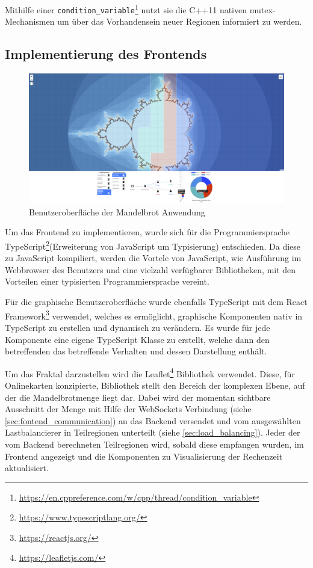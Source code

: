 Mithilfe einer \texttt{condition\_variable}\footnote{\url{https://en.cppreference.com/w/cpp/thread/condition_variable}}
nutzt sie die C++11 nativen mutex-Mechanismen um über das Vorhandensein neuer Regionen informiert zu werden.

\subsection{Implementierung des Frontends}
\begin{figure}
	\centering
	\includegraphics[width=\linewidth]{img/Implementierung/ui}
	\caption{Benutzeroberfläche der Mandelbrot Anwendung}
	\label{fig:ui-screenshot}
\end{figure}
Um das Frontend zu implementieren, wurde sich für die Programmiersprache TypeScript\footnote{\url{https://www.typescriptlang.org/}}(Erweiterung von JavaScript um Typisierung) entschieden.
Da diese zu JavaScript kompiliert, werden die Vortele von JavaScript, wie Ausführung im Webbrowser des Benutzers und eine vielzahl verfügbarer Bibliotheken,
mit den Vorteilen einer typisierten Programmiersprache vereint.


Für die graphische Benutzeroberfläche wurde ebenfalls TypeScript mit dem React Framework\footnote{\url{https://reactjs.org/}} verwendet, welches es ermöglicht,
graphische Komponenten nativ in TypeScript zu erstellen und dynamisch zu verändern.
Es wurde für jede Komponente eine eigene TypeScript Klasse zu erstellt, welche dann den betreffenden
das betreffende Verhalten und dessen Darstellung enthält.


Um das Fraktal darzustellen wird die Leaflet\footnote{\url{https://leafletjs.com/}} Bibliothek verwendet.
Diese, für Onlinekarten konzipierte, Bibliothek stellt den Bereich der komplexen Ebene, auf der die Mandelbrotmenge liegt dar.
Dabei wird der momentan sichtbare Ausschnitt der Menge mit Hilfe der WebSockets Verbindung (siehe \autoref{sec:fontend_communication}) an das Backend versendet und vom ausgewählten Lastbalancierer in Teilregionen unterteilt (siehe \autoref{sec:load_balancing}).
Jeder der vom Backend berechneten Teilregionen wird, sobald diese empfangen wurden, im Frontend angezeigt und die Komponenten
zu Visualisierung der Rechenzeit aktualisiert.

